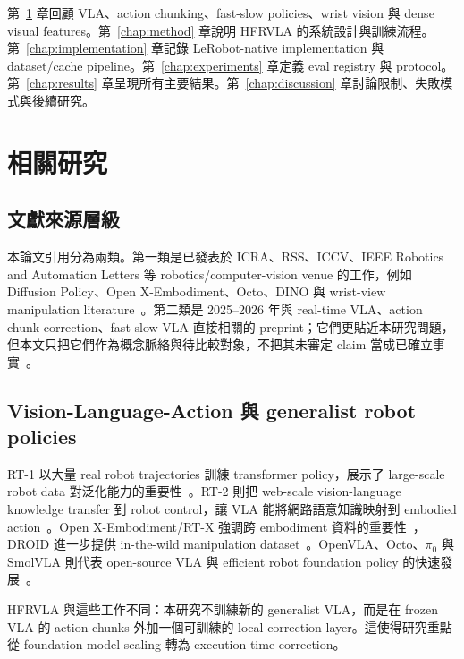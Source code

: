 \documentclass[12pt,a4paper,oneside]{report}
\newcommand{\method}{HFRVLA}
\newcommand{\smolvla}{SmolVLA}
\begin{document}
第~\ref{chap:related} 章回顧 VLA、action chunking、fast-slow policies、wrist vision 與 dense visual features。第~\ref{chap:method} 章說明 \method{} 的系統設計與訓練流程。第~\ref{chap:implementation} 章記錄 LeRobot-native implementation 與 dataset/cache pipeline。第~\ref{chap:experiments} 章定義 eval registry 與 protocol。第~\ref{chap:results} 章呈現所有主要結果。第~\ref{chap:discussion} 章討論限制、失敗模式與後續研究。

\chapter{相關研究}
\label{chap:related}

\section{文獻來源層級}

本論文引用分為兩類。第一類是已發表於 ICRA、RSS、ICCV、IEEE Robotics and Automation Letters 等 robotics/computer-vision venue 的工作，例如 Diffusion Policy、Open X-Embodiment、Octo、DINO 與 wrist-view manipulation literature~\citep{chi2023diffusionpolicy,openx2024,ghosh2024octo,caron2021dino,jangir2022lookcloser}。第二類是 2025--2026 年與 real-time VLA、action chunk correction、fast-slow VLA 直接相關的 preprint；它們更貼近本研究問題，但本文只把它們作為概念脈絡與待比較對象，不把其未審定 claim 當成已確立事實~\citep{sendai2025a2c2,black2025rtc,tang2025vlash,zhao2025vlarail,chen2025fastinslow,zou2025duocorefs,xie2026dynamicvla}。

\section{Vision-Language-Action 與 generalist robot policies}

RT-1 以大量 real robot trajectories 訓練 transformer policy，展示了 large-scale robot data 對泛化能力的重要性~\citep{brohan2022rt1}。RT-2 則把 web-scale vision-language knowledge transfer 到 robot control，讓 VLA 能將網路語意知識映射到 embodied action~\citep{brohan2023rt2}。Open X-Embodiment/RT-X 強調跨 embodiment 資料的重要性~\citep{openx2024}，DROID 進一步提供 in-the-wild manipulation dataset~\citep{khazatsky2024droid}。OpenVLA、Octo、$\pi_0$ 與 \smolvla{} 則代表 open-source VLA 與 efficient robot foundation policy 的快速發展~\citep{kim2024openvla,ghosh2024octo,black2024pi0,shukor2025smolvla}。

\method{} 與這些工作不同：本研究不訓練新的 generalist VLA，而是在 frozen VLA 的 action chunks 外加一個可訓練的 local correction layer。這使得研究重點從 foundation model scaling 轉為 execution-time correction。
\end{document}
